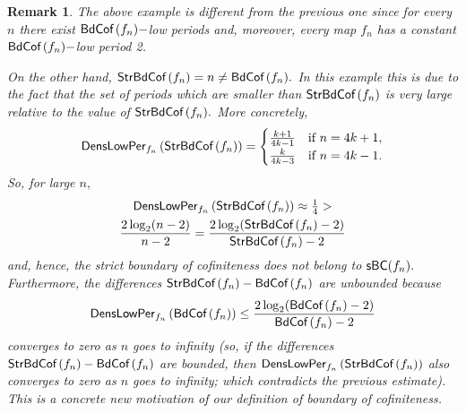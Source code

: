 \documentclass[a4paper, 11pt]{amsart}
\numberwithin{equation}{section}
\theoremstyle{customnumberedtheorem}
\theoremstyle{definitionwithbfnote}
\newtheorem{remark}[theorem]{Remark}
\DeclareMathOperator{\bc}{\textsf{\upshape BdCof\,}}
\DeclareMathOperator{\sbc}{\textsf{\upshape StrBdCof\,}}
\DeclareMathOperator{\sbcset}{\textsf{\upshape sBC}}
\begin{document}
\begin{remark}\label{rem:examplefirstexamplebcnintroduction}
The above example is different from the previous one
since for every $n$ there exist $\bc(f_n)-$low periods and, moreover,
every map $f_n$ has a constant $\bc(f_n)-$low period 2.

On the other hand, $\sbc(f_n) = n \ne \bc(f_n).$
In this example this is due to the fact that the set of periods which
are smaller than $\sbc(f_n)$ is very large relative to the value of
$\sbc(f_n).$ More concretely,
\[
   \textsf{DensLowPer}_{f_n}\left(\sbc(f_n)\right) =
   \begin{cases}
       \tfrac{k+1}{4k-1} & \text{if $n = 4k+1,$}\\
       \tfrac{k}{4k-3} & \text{if $n = 4k-1.$}
   \end{cases}
\]
So, for large $n,$
\begin{multline*}
   \textsf{DensLowPer}_{f_n}\left(\sbc(f_n)\right)  \approx \tfrac{1}{4} >\\
   \frac{2 \log_2(n-2)}{n-2} = \frac{2 \log_2(\sbc(f_n)-2)}{\sbc(f_n)-2}
\end{multline*}
and, hence, the strict boundary of cofiniteness does not belong to
$\sbcset(f_n).$
Furthermore, the differences $\sbc(f_n) - \bc(f_n)$ are unbounded
because
\[
  \textsf{DensLowPer}_{f_n}\left(\bc(f_n)\right) \le
        \frac{2 \log_2(\bc(f_n)-2)}{\bc(f_n)-2}
\]
converges to zero as $n$ goes to infinity (so, if
the differences $\sbc(f_n) - \bc(f_n)$ are bounded, then
$\textsf{DensLowPer}_{f_n}\left(\sbc(f_n)\right)$ also
converges to zero as $n$ goes to infinity; which contradicts the
previous estimate).
This is a concrete new motivation of our definition of boundary of
cofiniteness.
\end{remark}
\end{document}
